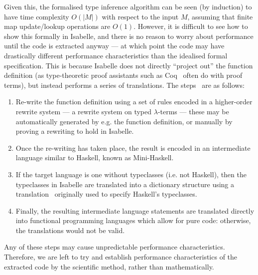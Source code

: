 Given this, the formalised type inference algorithm can be seen (by induction) to have time complexity \(O(|M|)\) with respect to the input \(M\), assuming that finite map update/lookup operations are \(O(1)\).
However, it is difficult to see how to show this formally in Isabelle, and there is no reason to worry about performance until the code is extracted anyway --- at which point the code may have drastically different performance characteristics than the idealised formal specification.
This is because Isabelle does not directly ``project out'' the function definition (as type-theoretic proof assistants such as Coq~\cite{coq-extract} often do with proof terms), but instead performs a series of translations.
The steps~\cite{HRS} are as follows:
\begin{enumerate}
\item
Re-write the function definition using a set of rules encoded in a higher-order rewrite system --- a rewrite system on typed \(\lambda\)-terms --- these may be automatically generated by e.g. the function definition, or manually by proving a rewriting to hold in Isabelle.
\item
Once the re-writing has taken place, the result is encoded in an intermediate language similar to Haskell, known as Mini-Haskell.
\item
If the target language is one without typeclasses (i.e. not Haskell), then the typeclasses in Isabelle are translated into a dictionary structure using a translation~\cite{dictionary-translation} originally used to specify Haskell's typeclasses.
\item
Finally, the resulting intermediate language statements are translated directly into functional programming languages which allow for pure code: otherwise, the translations would not be valid.
\end{enumerate}

Any of these steps may cause unpredictable performance characteristics.
Therefore, we are left to try and establish performance characteristics of the extracted code by the scientific method, rather than mathematically.

